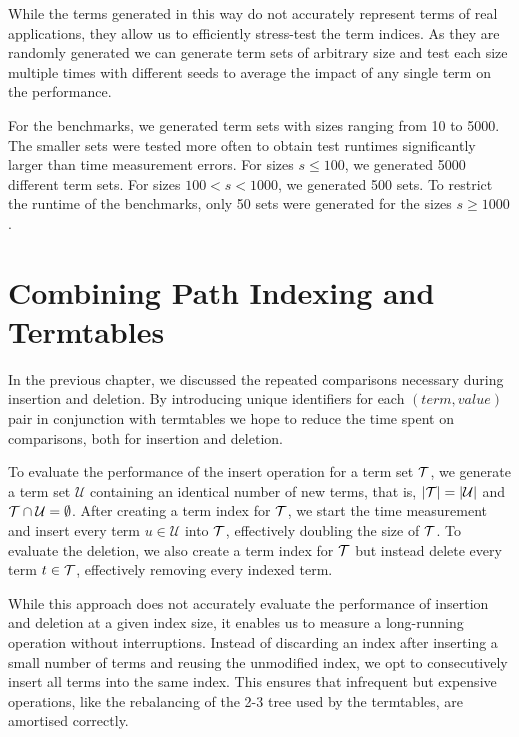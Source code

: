 While the terms generated in this way do not accurately represent terms of real applications, they allow us to efficiently stress-test the term indices. As they are randomly generated we can generate term sets of arbitrary size and test each size multiple times with different seeds to average the impact of any single term on the performance.

For the benchmarks, we generated term sets with sizes ranging from 10 to 5000. The smaller sets were tested more often to obtain test runtimes significantly larger than time measurement errors. For sizes $s \leq 100$, we generated 5000 different term sets. For sizes $100 < s < 1000$, we generated 500 sets. To restrict the runtime of the benchmarks, only 50 sets were generated for the sizes $s \geq 1000$.


\section{Combining Path Indexing and Termtables} \label{pathindex_termtab}
In the previous chapter, we discussed the repeated comparisons necessary during insertion and deletion. By introducing unique identifiers for each $(term,value)$ pair in conjunction with termtables we hope to reduce the time spent on comparisons, both for insertion and deletion.

To evaluate the performance of the insert operation for a term set $\mathcal{T}$, we generate a term set $\mathcal{U}$ containing an identical number of new terms, that is, $|\mathcal{T}| = |\mathcal{U}|$ and $\mathcal{T} \cap \mathcal{U} = \emptyset$. After creating a term index for $\mathcal{T}$, we start the time measurement and insert every term $u \in \mathcal{U}$ into $\mathcal{T}$, effectively doubling the size of $\mathcal{T}$. To evaluate the deletion, we also create a term index for $\mathcal{T}$ but instead delete every term $t \in \mathcal{T}$, effectively removing every indexed term.

While this approach does not accurately evaluate the performance of insertion and deletion at a given index size, it enables us to measure a long-running operation without interruptions. Instead of discarding an index after inserting a small number of terms and reusing the unmodified index, we opt to consecutively insert all terms into the same index. This ensures that infrequent but expensive operations, like the rebalancing of the 2-3 tree used by the termtables, are amortised correctly.

